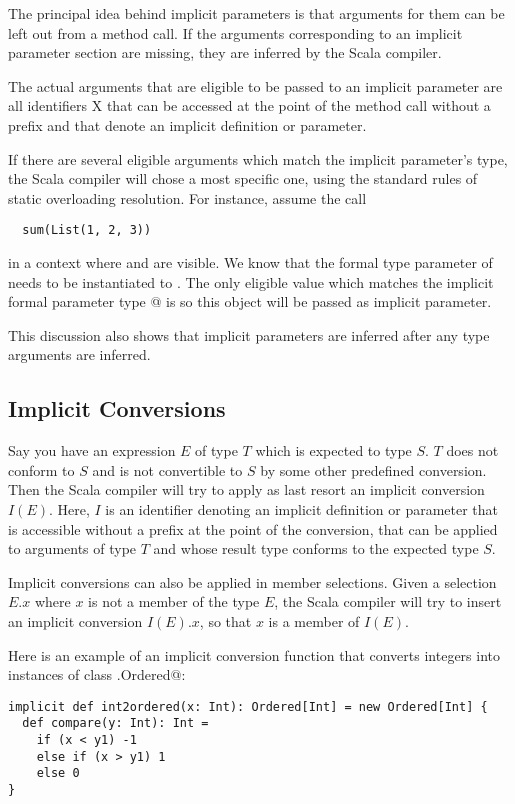 {The principal idea behind implicit parameters is that arguments for
them can be left out from a method call. If the arguments
corresponding to an implicit parameter section are missing, they are
inferred by the Scala compiler.

The actual arguments that are eligible to be passed to an implicit
parameter are all identifiers X that can be accessed at the point
of the method call without a prefix and that denote an implicit
definition or parameter.

If there are several eligible arguments which match the implicit
parameter's type, the Scala compiler will chose a most specific one,
using the standard rules of static overloading resolution.
For instance, assume the call
\begin{lstlisting}
  sum(List(1, 2, 3))
\end{lstlisting}
in a context where \lstinline@stringMonoid@ and \lstinline@intMonoid@
are visible.  We know that the formal type parameter \lstinline@a@ of
\lstinline@sum@ needs to be instantiated to \lstinline@int@. The only
eligible value which matches the implicit formal parameter type
\lstinline@Monoid[Int]@ is \lstinline@intMonoid@ so this object will %
be passed as implicit parameter.

This discussion also shows that implicit parameters are inferred after
any type arguments are inferred. 

\subsection*{Implicit Conversions}

Say you have an expression $E$ of type $T$ which is expected to type
$S$. $T$ does not conform to $S$ and is not convertible to $S$ by
some other predefined conversion. Then the Scala compiler will try to
apply as last resort an implicit conversion $I(E)$. Here, $I$ is an
identifier denoting an implicit definition or parameter that is
accessible without a prefix at the point of the conversion, that can
be applied to arguments of type $T$ and whose result type conforms to the
expected type $S$.

Implicit conversions can also be applied in member
selections. Given a selection $E.x$ where $x$ is not a member of the
type $E$, the Scala compiler will try to insert an implicit conversion
$I(E).x$, so that $x$ is a member of $I(E)$.

Here is an example of an implicit conversion function that converts
integers into instances of class \lstinline@scala.Ordered@:
\begin{lstlisting}
implicit def int2ordered(x: Int): Ordered[Int] = new Ordered[Int] {
  def compare(y: Int): Int =
    if (x < y1) -1
    else if (x > y1) 1
    else 0
}
\end{lstlisting}

}
